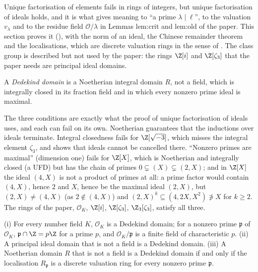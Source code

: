 Unique factorisation of elements fails in rings of integers, but unique factorisation of ideals holds, and it is what gives meaning to
``a prime $\lambda\mid\ell$'', to the valuation $v_\lambda$ and to the residue field $\mathcal O/\lambda$ in Lemmas lem:crit and lem:old of the paper.
This section proves it (), with the norm of an ideal, the Chinese remainder theorem and the localisations,
which are discrete valuation rings in the sense of . The class group is described but not used by the paper: the rings
$\Z[i]$ and $\Z[\zeta_3]$ that the paper needs are principal ideal domains.

\begin{definition}\label{def:ant:dedekind}
A \emph{Dedekind domain} is a Noetherian integral domain $R$, not a field, which is integrally closed in its fraction field and in which every
nonzero prime ideal is maximal.
\end{definition}

The three conditions are exactly what the proof of unique factorisation of ideals uses, and each can fail on its own. Noetherian guarantees that the
inductions over ideals terminate. Integral closedness fails for $\Z[\sqrt{-3}]$, which misses the integral element $\zeta_3$, and
 shows that ideals cannot be cancelled there. ``Nonzero primes are maximal'' (dimension one) fails for $\Z[X]$, which is
Noetherian and integrally closed (a UFD) but has the chain of primes $0\subsetneq(X)\subsetneq(2,X)$; and in $\Z[X]$ the ideal $(4,X)$ is not a product of
primes at all: a prime factor would contain $(4,X)$, hence $2$ and $X$, hence be the maximal ideal $(2,X)$, but $(2,X)\ne(4,X)$ (as $2\notin(4,X)$) and
$(2,X)^k\subseteq(4,2X,X^2)\not\ni X$ for $k\ge2$. The rings of the paper, $\mathcal O_K$, $\Z[i]$, $\Z[\zeta_3]$, $\Z_3[\zeta_3]$,
satisfy all three.

\begin{theorem}\label{thm:ant:dedekind}
(i) For every number field $K$, $\mathcal O_K$ is a Dedekind domain; for a nonzero prime $\mathfrak p$ of $\mathcal O_K$, $\mathfrak p\cap\Z=p\Z$ for a
prime $p$, and $\mathcal O_K/\mathfrak p$ is a finite field of characteristic $p$. (ii) A principal ideal domain that is not a field is a Dedekind
domain. (iii) A Noetherian domain $R$ that is not a field is a Dedekind domain if and only if the localisation $R_{\mathfrak p}$ is a discrete
valuation ring for every nonzero prime $\mathfrak p$.
\end{theorem}

